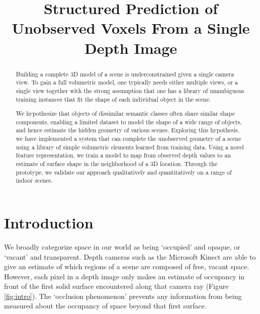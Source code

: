 \documentclass[10pt,twocolumn,letterpaper]{article}
\title{Structured Prediction of Unobserved Voxels From a Single Depth Image}
\begin{document}
\maketitle

\begin{abstract}
  Building a complete 3D model of a scene is underconstrained given a single camera view.
  To gain a full volumetric model, one typically needs either multiple views, or a single view together with the strong assumption that one has a library of unambiguous training instances that fit the shape of each individual object in the scene.

  We hypothesize that objects of dissimilar semantic classes often share similar shape components, enabling a limited dataset to model the shape of a wide range of objects, and hence estimate the hidden geometry of various scenes.
  Exploring this hypothesis, we have implemented a system that can complete the unobserved geometry of a scene using a library of simple volumetric elements learned from training data.
  Using a novel feature representation, we train a model to map from observed depth values to an estimate of surface shape in the neighborhood of a 3D location.
  Through the prototype, we validate our approach qualitatively and quantitatively on a range of indoor scenes.

\end{abstract}

\section{Introduction}


We broadly categorize space in our world as being `occupied' and opaque, or `vacant' and transparent.
Depth cameras such as the Microsoft Kinect are able to give an estimate of which regions of a scene are composed of free, vacant space.
However, each pixel in a depth image only makes an estimate of occupancy in front of the first solid surface encountered along that camera ray (Figure \ref{fig:intro}).
The `occlusion phenomenon' prevents any information from being measured about the occupancy of space beyond that first surface.
\end{document}
